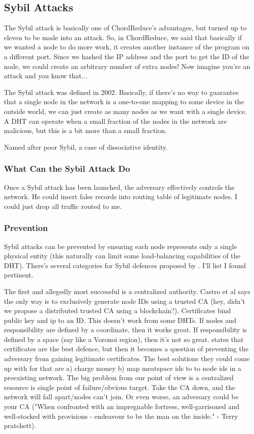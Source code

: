 \documentclass[10pt,letterpaper]{report}
\begin{document}
\subsection{Sybil Attacks}
The Sybil attack is basically one of ChordReduce's advantages, but turned up to eleven to be made into an attack.  So, in ChordReduce, we said that basically if we wanted a node to do more work,  it creates another instance of the program on a different port.  Since we hashed the IP address and the port to get the ID of the node, we could create an arbitrary number of extra nodes!  Now imagine you're an attack and you know that...

The Sybil attack was defined in 2002.  Basically,  if there's no way to guarantee that a single node in the network is a one-to-one mapping to some device in the outside world, we can just create as many nodes as we want with a single device.  A DHT can operate when a small fraction of the nodes in the network are malicious, but this is a bit more than a small fraction.  

Named after poor Sybil, a case of dissociative identity.

\subsubsection{What Can the Sybil Attack Do}
Once a Sybil attack has been launched,  the adversary effectively controls the network.   He could insert false records into routing table of legitimate nodes.  I could just drop all traffic routed to me.

\subsubsection{Prevention}


Sybil attacks can be prevented by ensuring each node represents only a single physical entity (this naturally can limit some load-balancing capabilities of the DHT). There's several categories for Sybil defences proposed by \cite{dhtsec}.  I'll list I found pertinent.

The first and allegedly most successful is a centralized authority.  Castro et al says the only way is to exclusively generate node IDs using a trusted CA (hey, didn't we propose a distributed trusted CA using a blockchain?).   Certificates bind public key and ip to an ID. This doesn't work from some DHTs.  If nodes and responsibility are defined by a coordinate, then it works great.  If responsibility is defined by a space (say like a Voronoi region), then it's not so great.  \cite{dhtsec} states that certificates are the best defence, but then it becomes a question of preventing the adversary from gaining legitimate certificates.  The best solutions they could come up with for that are a) charge money b) map meatspace ids to to node ids in a preexisting network.  The big problem from our point of view is a centralized resource is single point of failure/obvious target.   Take the CA down, and the network will fall apart/nodes can't join.  Or even worse, an adversary could be your CA ("When confronted with an impregnable fortress, well-garrisoned and well-stocked with provisions - endeavour to be the man on the inside." - Terry pratchett).
\end{document}
